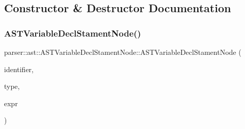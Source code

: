 \subsection{Constructor \& Destructor Documentation}
\mbox{\label{classparser_1_1ast_1_1ASTVariableDeclStamentNode_a614793e4f5b9338d2636d8272a766c59}} 
\subsubsection{\texorpdfstring{A\+S\+T\+Variable\+Decl\+Stament\+Node()}{ASTVariableDeclStatementNode()}\hspace{0.1cm}{\footnotesize\ttfamily [1/2]}}
{\footnotesize\ttfamily parser\+::ast\+::\+A\+S\+T\+Variable\+Decl\+Stament\+Node\+::\+A\+S\+T\+Variable\+Decl\+Stament\+Node (\begin{DoxyParamCaption}\item[{const std\+::string \&}]{identifier,  }\item[{\hyperlink{ASTVariableDeclStamentNode_8h_a1e8e1bde0729627e3a22ffa858d5f3b9}{Variable\+Type}}]{type,  }\item[{const \hyperlink{classparser_1_1ast_1_1ASTExprNode}{A\+S\+T\+Expr\+Node} $\ast$}]{expr }\end{DoxyParamCaption})}

